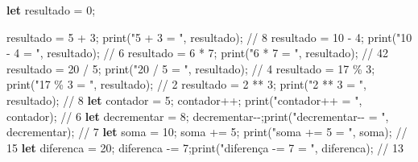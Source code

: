 \documentclass[
  portuguese,
  letterpaper,
  DIV=11,
  numbers=noendperiod]{scrreprt}
\newenvironment{Shaded}{\begin{snugshade}}{\end{snugshade}}
\newcommand{\CommentTok}[1]{\textcolor[rgb]{0.37,0.37,0.37}{#1}}
\newcommand{\DecValTok}[1]{\textcolor[rgb]{0.68,0.00,0.00}{#1}}
\newcommand{\FunctionTok}[1]{\textcolor[rgb]{0.28,0.35,0.67}{#1}}
\newcommand{\KeywordTok}[1]{\textcolor[rgb]{0.00,0.23,0.31}{\textbf{#1}}}
\newcommand{\NormalTok}[1]{\textcolor[rgb]{0.00,0.23,0.31}{#1}}
\newcommand{\OperatorTok}[1]{\textcolor[rgb]{0.37,0.37,0.37}{#1}}
\newcommand{\StringTok}[1]{\textcolor[rgb]{0.13,0.47,0.30}{#1}}
\begin{document}
\begin{Shaded}
\begin{Highlighting}[]
\KeywordTok{let}\NormalTok{ resultado }\OperatorTok{=} \DecValTok{0}\OperatorTok{;}

\NormalTok{resultado }\OperatorTok{=} \DecValTok{5} \OperatorTok{+} \DecValTok{3}\OperatorTok{;}                 \FunctionTok{print}\NormalTok{(}\StringTok{"5 + 3 = "}\OperatorTok{,}\NormalTok{ resultado)}\OperatorTok{;}          \CommentTok{// 8}
\NormalTok{resultado }\OperatorTok{=} \DecValTok{10} \OperatorTok{{-}} \DecValTok{4}\OperatorTok{;}                \FunctionTok{print}\NormalTok{(}\StringTok{"10 {-} 4 = "}\OperatorTok{,}\NormalTok{ resultado)}\OperatorTok{;}          \CommentTok{// 6}
\NormalTok{resultado }\OperatorTok{=} \DecValTok{6} \OperatorTok{*} \DecValTok{7}\OperatorTok{;}                 \FunctionTok{print}\NormalTok{(}\StringTok{"6 * 7 = "}\OperatorTok{,}\NormalTok{ resultado)}\OperatorTok{;}           \CommentTok{// 42}
\NormalTok{resultado }\OperatorTok{=} \DecValTok{20} \OperatorTok{/} \DecValTok{5}\OperatorTok{;}                \FunctionTok{print}\NormalTok{(}\StringTok{"20 / 5 = "}\OperatorTok{,}\NormalTok{ resultado)}\OperatorTok{;}          \CommentTok{// 4}
\NormalTok{resultado }\OperatorTok{=} \DecValTok{17} \OperatorTok{\%} \DecValTok{3}\OperatorTok{;}                \FunctionTok{print}\NormalTok{(}\StringTok{"17 \% 3 = "}\OperatorTok{,}\NormalTok{ resultado)}\OperatorTok{;}          \CommentTok{// 2}
\NormalTok{resultado }\OperatorTok{=} \DecValTok{2} \OperatorTok{**} \DecValTok{3}\OperatorTok{;}                \FunctionTok{print}\NormalTok{(}\StringTok{"2 ** 3 = "}\OperatorTok{,}\NormalTok{ resultado)}\OperatorTok{;}          \CommentTok{// 8}
\KeywordTok{let}\NormalTok{ contador }\OperatorTok{=} \DecValTok{5}\OperatorTok{;}\NormalTok{ contador}\OperatorTok{++;}      \FunctionTok{print}\NormalTok{(}\StringTok{"contador++ = "}\OperatorTok{,}\NormalTok{ contador)}\OperatorTok{;}       \CommentTok{// 6}
\KeywordTok{let}\NormalTok{ decrementar }\OperatorTok{=} \DecValTok{8}\OperatorTok{;}\NormalTok{ decrementar}\OperatorTok{{-}{-};}\FunctionTok{print}\NormalTok{(}\StringTok{"decrementar{-}{-} = "}\OperatorTok{,}\NormalTok{ decrementar)}\OperatorTok{;} \CommentTok{// 7}
\KeywordTok{let}\NormalTok{ soma }\OperatorTok{=} \DecValTok{10}\OperatorTok{;}\NormalTok{ soma }\OperatorTok{+=} \DecValTok{5}\OperatorTok{;}          \FunctionTok{print}\NormalTok{(}\StringTok{"soma += 5 = "}\OperatorTok{,}\NormalTok{ soma)}\OperatorTok{;}            \CommentTok{// 15}
\KeywordTok{let}\NormalTok{ diferenca }\OperatorTok{=} \DecValTok{20}\OperatorTok{;}\NormalTok{ diferenca }\OperatorTok{{-}=} \DecValTok{7}\OperatorTok{;}\FunctionTok{print}\NormalTok{(}\StringTok{"diferença {-}= 7 = "}\OperatorTok{,}\NormalTok{ diferenca)}\OperatorTok{;}   \CommentTok{// 13}

\end{Highlighting}
\end{Shaded}
\end{document}
